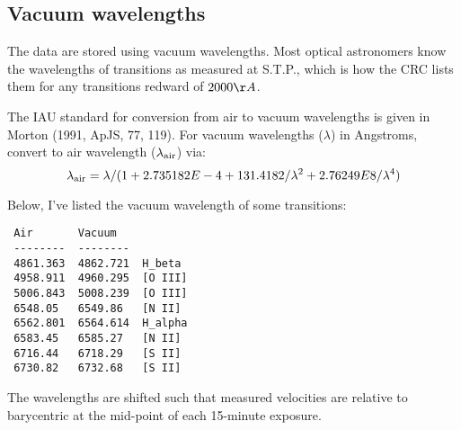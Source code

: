 \documentclass[12pt,preprint]{aastex}
\begin{document}
\subsection{Vacuum wavelengths}

The data are stored using vacuum wavelengths.
Most optical astronomers know the wavelengths of transitions
as measured at S.T.P., which is how the CRC lists them for any
transitions redward of $2000\AA$.

The IAU standard for conversion from air to vacuum wavelengths
is given in Morton (1991, ApJS, 77, 119). For vacuum wavelengths ($\lambda$)
in Angstroms, convert to air wavelength ($\lambda_{\rm air}$) via:
$$\lambda_{\rm air} = \lambda / (1 + 2.735182E-4 + 131.4182 / \lambda^2 + 2.76249E8 / \lambda^4) $$

Below, I've listed the vacuum wavelength of some transitions:
\begin{verbatim}
 Air       Vacuum
 --------  --------
 4861.363  4862.721  H_beta
 4958.911  4960.295  [O III]
 5006.843  5008.239  [O III]
 6548.05   6549.86   [N II]
 6562.801  6564.614  H_alpha
 6583.45   6585.27   [N II]
 6716.44   6718.29   [S II]
 6730.82   6732.68   [S II]
\end{verbatim}
The wavelengths are shifted such that measured velocities are relative
to barycentric at the mid-point of each 15-minute exposure.

\end{document}
